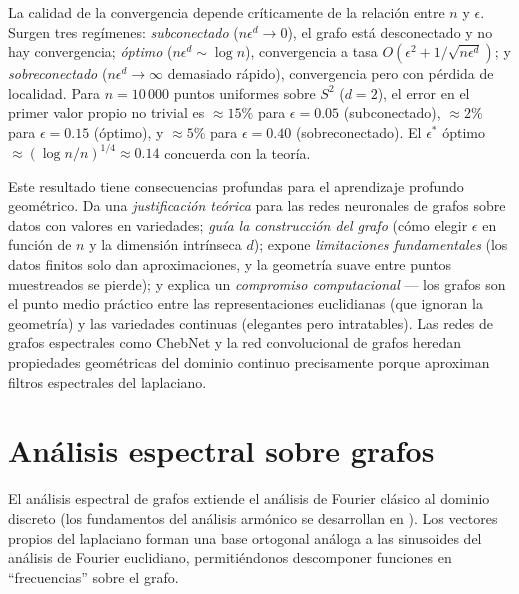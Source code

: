 \begin{remark}
\label{rem:graphs:convergence-rates}
La calidad de la convergencia depende cr\'iticamente de la relaci\'on entre $n$ y
$\epsilon$. Surgen tres reg\'imenes: \emph{subconectado} ($n\epsilon^d \to 0$), el
grafo est\'a desconectado y no hay convergencia; \emph{\'optimo}
($n\epsilon^d \sim \log n$), convergencia a tasa
$O(\epsilon^2 + 1/\sqrt{n\epsilon^d})$; y \emph{sobreconectado}
($n\epsilon^d \to \infty$ demasiado r\'apido), convergencia pero con p\'erdida de
localidad. Para $n = 10\,000$ puntos uniformes sobre $S^2$ ($d=2$), el error en el
primer valor propio no trivial es $\approx 15\%$ para $\epsilon = 0.05$
(subconectado), $\approx 2\%$ para $\epsilon = 0.15$ (\'optimo), y $\approx 5\%$
para $\epsilon = 0.40$ (sobreconectado). El $\epsilon^*$ \'optimo
$\approx (\log n / n)^{1/4} \approx 0.14$ concuerda con la teor\'ia.
\end{remark}

Este resultado tiene consecuencias profundas para el aprendizaje profundo
geom\'etrico. Da una \emph{justificaci\'on te\'orica} para las redes neuronales de
grafos sobre datos con valores en variedades; \emph{gu\'ia la construcci\'on del
grafo} (c\'omo elegir $\epsilon$ en funci\'on de $n$ y la dimensi\'on intr\'inseca
$d$); expone \emph{limitaciones fundamentales} (los datos finitos solo dan
aproximaciones, y la geometr\'ia suave entre puntos muestreados se pierde); y
explica un \emph{compromiso computacional} --- los grafos son el punto medio
pr\'actico entre las representaciones euclidianas (que ignoran la geometr\'ia) y
las variedades continuas (elegantes pero intratables). Las redes de grafos
espectrales como ChebNet y la red convolucional de grafos heredan propiedades
geom\'etricas del dominio continuo precisamente porque aproximan filtros
espectrales del laplaciano.

\section{An\'alisis espectral sobre grafos}
\label{sec:graphs:spectral}

El an\'alisis espectral de grafos extiende el an\'alisis de Fourier cl\'asico al
dominio discreto (los fundamentos del an\'alisis arm\'onico se desarrollan en
). Los vectores propios del laplaciano forman una base ortogonal
an\'aloga a las sinusoides del an\'alisis de Fourier euclidiano, permiti\'endonos
descomponer funciones en ``frecuencias'' sobre el grafo.

